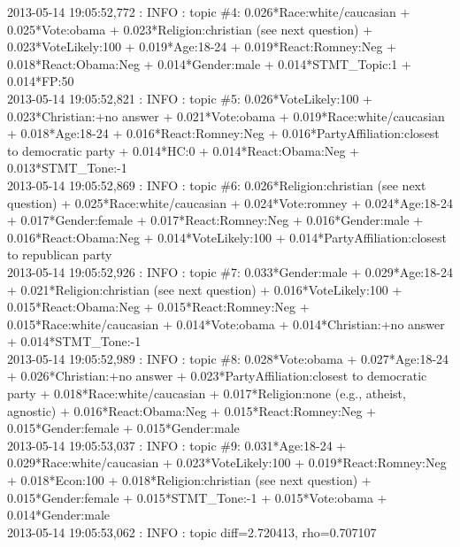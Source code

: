 2013-05-14 19:05:52,772 : INFO : topic \#4: 0.026*Race:white/caucasian + 0.025*Vote:obama + 0.023*Religion:christian (see next question) + 0.023*VoteLikely:100 + 0.019*Age:18-24 + 0.019*React:Romney:Neg + 0.018*React:Obama:Neg + 0.014*Gender:male + 0.014*STMT_Topic:1 + 0.014*FP:50\\

2013-05-14 19:05:52,821 : INFO : topic \#5: 0.026*VoteLikely:100 + 0.023*Christian:+no answer + 0.021*Vote:obama + 0.019*Race:white/caucasian + 0.018*Age:18-24 + 0.016*React:Romney:Neg + 0.016*PartyAffiliation:closest to democratic party + 0.014*HC:0 + 0.014*React:Obama:Neg + 0.013*STMT_Tone:-1\\

2013-05-14 19:05:52,869 : INFO : topic \#6: 0.026*Religion:christian (see next question) + 0.025*Race:white/caucasian + 0.024*Vote:romney + 0.024*Age:18-24 + 0.017*Gender:female + 0.017*React:Romney:Neg + 0.016*Gender:male + 0.016*React:Obama:Neg + 0.014*VoteLikely:100 + 0.014*PartyAffiliation:closest to republican party\\

2013-05-14 19:05:52,926 : INFO : topic \#7: 0.033*Gender:male + 0.029*Age:18-24 + 0.021*Religion:christian (see next question) + 0.016*VoteLikely:100 + 0.015*React:Obama:Neg + 0.015*React:Romney:Neg + 0.015*Race:white/caucasian + 0.014*Vote:obama + 0.014*Christian:+no answer + 0.014*STMT_Tone:-1\\

2013-05-14 19:05:52,989 : INFO : topic \#8: 0.028*Vote:obama + 0.027*Age:18-24 + 0.026*Christian:+no answer + 0.023*PartyAffiliation:closest to democratic party + 0.018*Race:white/caucasian + 0.017*Religion:none (e.g., atheist, agnostic) + 0.016*React:Obama:Neg + 0.015*React:Romney:Neg + 0.015*Gender:female + 0.015*Gender:male\\

2013-05-14 19:05:53,037 : INFO : topic \#9: 0.031*Age:18-24 + 0.029*Race:white/caucasian + 0.023*VoteLikely:100 + 0.019*React:Romney:Neg + 0.018*Econ:100 + 0.018*Religion:christian (see next question) + 0.015*Gender:female + 0.015*STMT_Tone:-1 + 0.015*Vote:obama + 0.014*Gender:male\\

2013-05-14 19:05:53,062 : INFO : topic diff=2.720413, rho=0.707107
